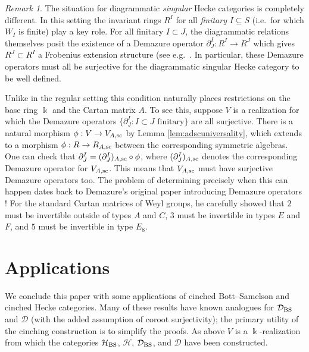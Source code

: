 \documentclass{amsart}
\theoremstyle{plain}
\theoremstyle{definition}
\theoremstyle{remark}
\newtheorem{rem}[thm]{Remark}
\numberwithin{equation}{section}
\newcommand{\defnemph}[1]{\emph{#1}}
\begin{document}
\begin{rem}
The situation for diagrammatic \emph{singular} Hecke categories is completely different. 
In this setting the invariant rings $R^I$ for all \defnemph{finitary} $I \subseteq S$ (i.e.~for which $W_I$ is finite) play a key role. 
For all finitary $I \subset J$, the diagrammatic relations themselves posit the existence of a Demazure operator $\partial_J^I : R^I \rightarrow R^J$ which gives $R^J \subset R^I$ a Frobenius extension structure (see e.g.~\cite[\S 24.2.1]{emtw}. %
In particular, these Demazure operators must all be surjective for the diagrammatic singular Hecke category to be well defined. 

Unlike in the regular setting this condition naturally places restrictions on the base ring $\Bbbk$ and the Cartan matrix $A$. 
To see this, suppose $V$ is a realization for which the Demazure operators $\{\partial_J^I : I \subset J \text{ finitary}\}$ are all surjective. 
There is a natural morphism $\phi:V \rightarrow V_{A,{\rm sc}}$ by Lemma \ref{lem:adscuniversality}, which extends to a morphism $\phi:R \rightarrow R_{A,{\rm sc}}$ between the corresponding symmetric algebras.
One can check that $\partial_J^I = (\partial_J^I)_{A,{\rm sc}} \circ \phi$, where $(\partial_J^I)_{A,{\rm sc}}$ denotes the corresponding Demazure operator for $V_{A,{\rm sc}}$. 
This means that $V_{A,{\rm sc}}$ must have surjective Demazure operators too. 
The problem of determining precisely when this can happen dates back to Demazure's original paper introducing Demazure operators \cite{demazure}!
For the standard Cartan matrices of Weyl groups, he carefully showed that $2$ must be invertible outside of types $A$ and $C$, $3$ must be invertible in types $E$ and $F$, and $5$ must be invertible in type $E_8$.
\end{rem}

\section{Applications}





We conclude this paper with some applications of cinched Bott--Samelson and cinched Hecke categories. 
Many of these results have known analogues for $\mathcal{D}_{\rm BS}$ and $\mathcal{D}$ (with the added assumption of coroot surjectivity); the primary utility of the cinching construction is to simplify the proofs. 
As above $V$ is a $\Bbbk$-realization from which the categories $\mathcal{H}_{\rm BS}$, $\mathcal{H}$, $\mathcal{D}_{\rm BS}$, and $\mathcal{D}$ have been constructed.
\end{document}
